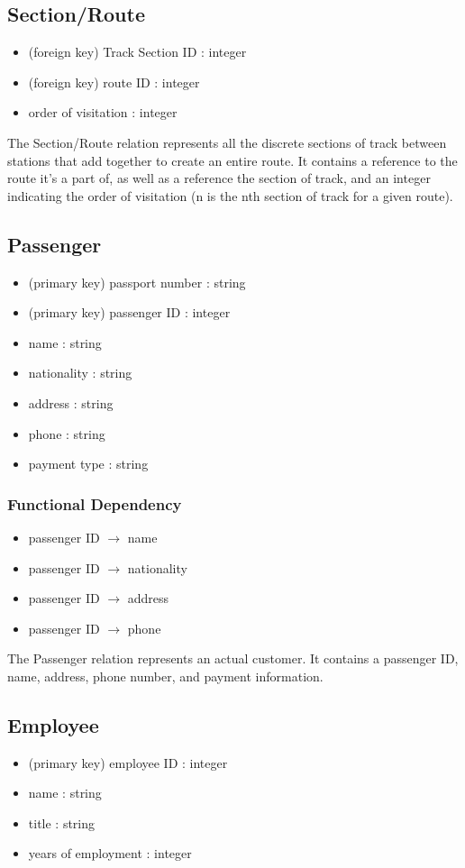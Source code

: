 \documentclass[a4paper]{article}
\begin{document}
\subsection*{Section/Route}
\begin{itemize}
\item (foreign key) Track Section ID : integer
\item (foreign key) route ID : integer
\item order of visitation  : integer
\end{itemize}
The Section/Route relation represents all the discrete sections of track between stations that add together to create an entire route. It contains a reference to the route it's a part of, as well as a reference the section of track, and an integer indicating the order of visitation (n is the nth section of track for a given route).

\subsection*{Passenger}
\begin{itemize}
\item (primary key) passport number : string
\item (primary key) passenger ID : integer
\item name : string
\item nationality : string
\item address : string
\item phone : string
\item payment type : string
\end{itemize}
\subsubsection*{Functional Dependency}
\begin{itemize}
\item passenger ID $\rightarrow$ name
\item passenger ID $\rightarrow$ nationality
\item passenger ID $\rightarrow$ address
\item passenger ID $\rightarrow$ phone
\end{itemize}
The Passenger relation represents an actual customer. It contains a passenger ID, name, address, phone number, and payment information.

\subsection*{Employee}
\begin{itemize}
\item (primary key) employee ID : integer
\item name : string 
\item title : string
\item years of employment : integer
\end{itemize}
\end{document}
